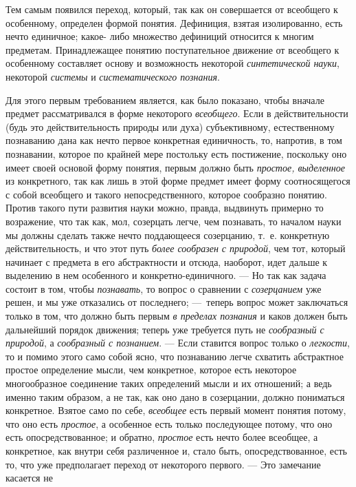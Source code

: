 \documentclass[twoside]{article}
\begin{document}
Тем самым появился переход, который, так как он совершается от
всеобщего к особенному, определен формой понятия. Дефиниция, взятая
изолированно, есть нечто единичное; какое- либо множество дефиниций
относится к многим предметам. Принадлежащее понятию поступательное движение
от всеобщего к особенному составляет основу и возможность некоторой
{\em синтетической науки},
некоторой {\em системы}
и {\em систематического
познания}.

Для этого первым требованием является, как было показано,
чтобы вначале предмет рассматривался в форме некоторого
{\em всеобщего}. Если в
действительности (будь это действительность природы или духа)
субъективному, естественному познаванию дана как нечто первое конкретная
единичность, то, напротив, в том познавании, которое по крайней мере
постольку есть постижение, поскольку оно имеет своей основой форму понятия,
первым должно быть {\em простое,
выделенное} из конкретного, так как лишь в этой форме
предмет имеет форму соотносящегося с собой всеобщего и такого
непосредственного, которое сообразно понятию. Против такого пути развития
науки можно, правда, выдвинуть примерно то возражение, что так как, мол,
созерцать легче, чем познавать, то началом науки мы должны
сделать также нечто поддающееся созерцанию, т.~е. конкретную
действительность, и что этот путь
{\em более сообразен с природой},
чем тот, который начинает с предмета в его абстрактности и
отсюда, наоборот, идет дальше к выделению в нем особенного и
конкретно-единичного. — Но так как задача состоит в том,
чтобы {\em познавать}, то
вопрос о сравнении с {\em созерцанием}
уже решен, и мы уже отказались от последнего;
—~теперь вопрос может заключаться только в том, что должно
быть первым {\em в пределах познания}
и каков должен быть дальнейший порядок движения; теперь уже
требуется путь не {\em сообразный с
природой}, а{\em 
сообразный с познанием}. — Если ставится
вопрос только о {\em легкости},
то и помимо этого само собой ясно, что познаванию легче
схватить абстрактное простое определение мысли, чем конкретное, которое
есть некоторое многообразное соединение таких определений мысли и их
отношений; а ведь именно таким образом, а не так, как оно дано в
созерцании, должно пониматься конкретное. Взятое само по себе,
{\em всеобщее} есть
первый момент понятия потому, что оно есть
{\em простое}, а
особенное есть только последующее потому, что оно есть опосредствованное; и
обратно, {\em простое}
есть нечто более всеобщее, а конкретное, как внутри себя
различенное и, стало быть, опосредствованное, есть то, что уже предполагает
переход от некоторого первого. — Это замечание касается не
\end{document}
